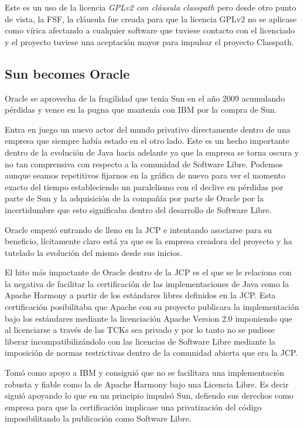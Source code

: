\documentclass[11pt]{scrartcl}
\begin{document}
Este es un uso de la licencia \emph{GPLv2 con cláusula classpath} pero desde otro punto de vista, la FSF, la cláusula fue creada para que la licencia GPLv2 no se aplicase como vírica afectando a cualquier software que tuviese contacto con el licenciado y el proyecto tuviese una aceptación mayor para impulsar el proyecto Classpath.

\subsection{Sun becomes Oracle}

Oracle se aprovecha de la fragilidad que tenía Sun en el año 2009 acumulando pérdidas y vence en la pugna que mantenía con IBM por la compra de Sun.

Entra en juego un nuevo actor del mundo privativo directamente dentro de una empresa que siempre había estado en el otro lado. Este es un hecho importante dentro de la evolución de Java hacia adelante ya que la empresa se torna oscura y no tan comprensiva con respecto a la comunidad de Software Libre. Podemos aunque seamos repetitivos fijarnos en la gráfica de nuevo para ver el momento exacto del tiempo estableciendo un paralelismo con el declive en pérdidas por parte de Sun y la adquisición de la compañía por parte de Oracle por la incertidumbre que esto significaba dentro del desarrollo de Software Libre.

Oracle empezó entrando de lleno en la JCP e intentando asociarse para su beneficio, lícitamente claro está ya que es la empresa creadora del proyecto y ha tutelado la evolución del mismo desde sus inicios.

El hito más impactante de Oracle dentro de la JCP es el que se le relaciona con la negativa de facilitar la certificación de las implementaciones de Java como la Apache Harmony a partir de los estándares libres definidos en la JCP. Esta certificación posibilitaba que Apache con su proyecto publicara la implementación bajo los estándares mediante la licenciación Apache Version 2.0 imponiendo que al licenciarse a través de las TCKs sea privado y por lo tanto no se pudiese liberar incompatibilizándolo con las licencias de Software Libre mediante la imposición de normas restrictivas dentro de la comunidad abierta que era la JCP.

Tomó como apoyo a IBM y consiguió que no se facilitara una implementación robusta y fiable como la de Apache Harmony bajo una Licencia Libre. Es decir siguió apoyando lo que en un principio impulsó Sun, defiendo sus derechos como empresa para que la certificación implicase una privatización del código imposibilitando la publicación como Software Libre.
\end{document}
